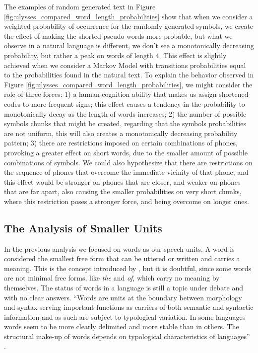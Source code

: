 The examples of random generated text in Figure \ref{fig:ulysses_compared_word_length_probabilities}
show that when we consider a weighted probability of occurrence for the randomly generated symbols,
we create the effect of making the shorted pseudo-words more probable, but what we observe in a
natural language is different, we don't see a monotonically decreasing probability, but rather
a peak on words of length $4$. This effect is slightly achieved when we consider a Markov Model with
transitions probabilities equal to the probabilities found in the natural text.
To explain the behavior observed in Figure \ref{fig:ulysses_compared_word_length_probabilities}, we 
might consider the role of three forces: 1) a human cognition ability that makes us assign
shortened codes to more frequent signs; this effect causes a tendency in the probability to 
monotonically decay as the length of words increases; 2) the number of possible symbols chunks that
might be created, regarding that the symbols probabilities are not uniform, this will also 
creates a monotonically decreasing probability pattern; 3) there are restrictions imposed on
certain combinations of phones, provoking a greater effect on short words, due to the smaller
amount of possible combinations of symbols. We could also hypothesize that there are restrictions
on the sequence of phones that overcome the immediate vicinity of that phone, and this effect 
would be stronger on phones that are closer, and weaker on phones that are far apart, 
also causing the smaller probabilities on very
short chunks, where this restriction poses a stronger force, and being overcome on longer ones.







\subsection{The Analysis of Smaller Units}
\label{sec:smaller_units}
In the previous analysis we focused on words as our speech units.
A word is considered the smallest free form that can be uttered or written and carries a meaning.
This is the concept introduced by \citet{bloomfield1926}, but it is doubtful, since some words are not
minimal free forms, like \textit{the} and \textit{of}, which carry no meaning by themselves.
The status of words in a language is still a topic under debate and with no clear answers.
``Words are units at the boundary between morphology and syntax serving important functions as carriers of both semantic and syntactic information and as such are subject to typological variation. In some languages words seem to be more clearly delimited and more stable than in others. The structural make-up of words depends on typological characteristics of languages'' \citep{coulmas}.


